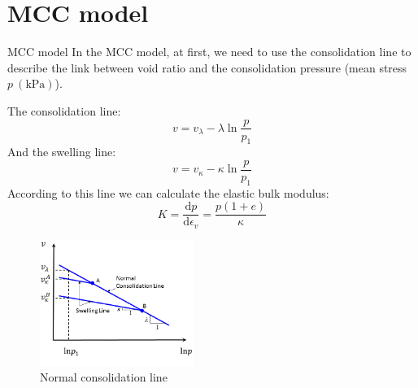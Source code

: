 \documentclass[aspectratio=169]{beamer}
\begin{document}
\section{MCC model}
\begin{frame}{MCC model}
    In the MCC model, at first, we need to use the consolidation line to describe the link between void ratio and the consolidation pressure (mean stress $p\ (\mathrm{kPa})$).
    \vspace{0.2cm}
    
    \begin{minipage}[c]{0.58\linewidth}
        The consolidation line: 
        \vspace{-2mm}
        \begin{equation}
            v = v_{\lambda}-\lambda\ln{\frac{p}{p_1}}
            \label{eq: consolidation line}
        \end{equation}
        \vspace{-1mm}
        And the swelling line:
        \vspace{-2mm}
        \begin{equation}
            v = v_{\kappa}-\kappa\ln{\frac{p}{p_1}}
            \label{eq: swelling line}
        \end{equation}
        \vspace{-1mm}
        According to this line we can calculate the elastic bulk modulus:
        \vspace{-2mm}
        \begin{equation}
            K = \frac{\mathrm{d}p}{\mathrm{d}\epsilon_v}=\frac{p(1+e)}{\kappa}
            \label{eq: elatic modulus calculation in }
        \end{equation}
    \end{minipage}
    \hspace{3mm}
    \begin{minipage}[c]{0.38\linewidth}
        \centering
        \begin{figure}
            \centering
            \includegraphics[width=5cm]{./pic/normal consolidation.png}
            \caption{Normal consolidation line}
            \label{fig: normal consolidation}
        \end{figure}
    \end{minipage}
\end{frame}
\end{document}
